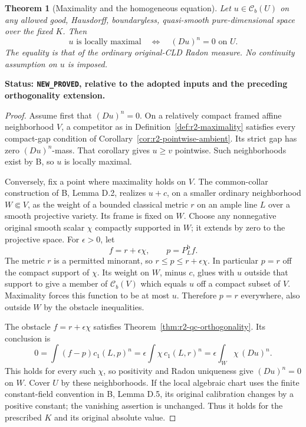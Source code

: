 \documentclass[11pt,a4paper]{article}
\numberwithin{equation}{section}
\newtheorem{theorem}{Theorem}[section]
\theoremstyle{definition}
\theoremstyle{remark}
\newcommand{\Cb}{\mathcal C_b}
\begin{document}
\begin{theorem}[Maximality and the homogeneous equation]
\label{thm:r2-maximal-ma-zero}
Let $u\in\Cb(U)$ on any allowed good, Hausdorff, boundaryless,
quasi-smooth pure-dimensional space over the fixed $K$. Then
\[
 u\text{ is locally maximal}
       \quad\Longleftrightarrow\quad (Du)^n=0\text{ on }U.
\]
The equality is that of the ordinary original-CLD Radon measure.
No continuity assumption on $u$ is imposed.
\end{theorem}

\noindent\textbf{Status: \texttt{NEW\_PROVED}, relative to the adopted
inputs and the preceding orthogonality extension.}

\begin{proof}
Assume first that $(Du)^n=0$. On a relatively compact framed
affine neighborhood $V$, a competitor as in
Definition~\ref{def:r2-maximality} satisfies every compact-gap
condition of Corollary~\ref{cor:r2-pointwise-ambient}. Its strict
gap has zero $(Du)^n$-mass. That corollary gives $u\geq v$
pointwise. Such neighborhoods exist by \textup{B}, so $u$ is
locally maximal.

Conversely, fix a point where maximality holds on $V$. The
common-collar construction of \textup{B}, Lemma D.2, realizes
$u+c$, on a smaller ordinary neighborhood $W\Subset V$, as the
weight of a bounded classical metric $r$ on an ample line $L$
over a smooth projective variety. Its frame is fixed on $W$.
Choose any nonnegative original smooth scalar $\chi$ compactly
supported in $W$; it extends by zero to the projective space.
For $\epsilon>0$, let
\[
 f=r+\epsilon\chi,\qquad p=P_L^{\mathrm b}f.
\]
The metric $r$ is a permitted minorant, so
$r\leq p\leq r+\epsilon\chi$. In particular $p=r$ off the
compact support of $\chi$. Its weight on $W$, minus $c$, glues
with $u$ outside that support to give a member of $\Cb(V)$
which equals $u$ off a compact subset of $V$. Maximality forces
this function to be at most $u$. Therefore $p=r$ everywhere,
also outside $W$ by the obstacle inequalities.

The obstacle $f=r+\epsilon\chi$ satisfies
Theorem~\ref{thm:r2-qc-orthogonality}. Its conclusion is
\[
 0=\int(f-p)c_1(L,p)^n
   =\epsilon\int\chi\,c_1(L,r)^n
   =\epsilon\int_W\chi\,(Du)^n.
\]
This holds for every such $\chi$, so positivity and Radon
uniqueness give $(Du)^n=0$ on $W$. Cover $U$ by these
neighborhoods. If the local algebraic chart uses the finite
constant-field convention in \textup{B}, Lemma D.5, its original
calibration changes by a positive constant; the vanishing
assertion is unchanged. Thus it holds for the prescribed $K$
and its original absolute value.
\end{proof}
\end{document}

